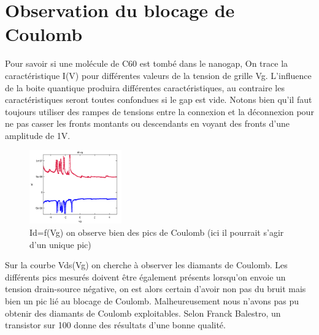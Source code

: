 \section{Observation du blocage de Coulomb}
Pour savoir si une molécule de C60 est tombé dans le nanogap, On trace la caractéristique I(V) pour différentes valeurs de la tension de grille Vg. L’influence de la boite quantique produira différentes caractéristiques, au contraire les caractéristiques seront toutes confondues si le gap est vide.
 Notons bien qu’il faut toujours utiliser des rampes de tensions entre la connexion et la déconnexion pour ne pas casser les fronts montants ou descendants en voyant des fronts d’une amplitude de 1V.
 \begin{figure}[h]
    \begin{center}
        \includegraphics[width=150px]{Images/Image_Blocage_Coulomb_1.png}
        \caption{Id=f(Vg) on observe bien des pics de Coulomb (ici il pourrait s’agir d’un unique pic)}
        \label{fig:}
    \end{center}
\end{figure}
Sur la courbe Vds(Vg) on cherche à observer les diamants de Coulomb. Les différents pics mesurés doivent être également présents lorsqu’on envoie un tension drain-source négative, on est alors certain d’avoir non pas du bruit mais bien un pic lié au blocage de Coulomb.
Malheureusement nous n’avons pas pu obtenir des diamants de Coulomb exploitables. Selon Franck Balestro, un transistor sur 100 donne des résultats d’une bonne qualité.

